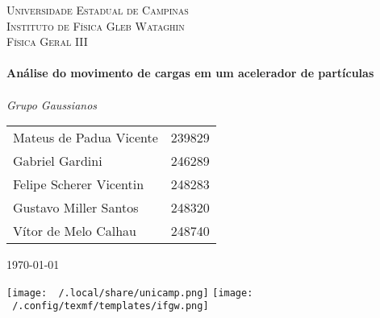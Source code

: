 \begin{titlepage}

	\center


	\textsc{\LARGE Universidade Estadual de Campinas}\\[1.5cm]

	\textsc{\Large Instituto de Física Gleb Wataghin}\\[0.5cm]

	\textsc{\large Física Geral III}\\[0.5cm]


	\HRule\\[0.4cm]

	{\huge\bfseries Análise do movimento de cargas em um acelerador de partículas}\\[0.4cm] %

	\HRule\\[1.5cm]

	{\large\textit{Grupo Gaussianos}} \\
	\begin{tabular}{ l r }
		Mateus de Padua Vicente & 239829 \\
		Gabriel Gardini         & 246289 \\
		Felipe Scherer Vicentin & 248283 \\
		Gustavo Miller Santos   & 248320 \\
		Vítor de Melo Calhau    & 248740
	\end{tabular}


	\vfill\vfill\vfill

	{\large\today}


	\vfill\vfill
	\texttt{[image: ~/.local/share/unicamp.png]}
	\hfill
	\texttt{[image: ~/.config/texmf/templates/ifgw.png]}
\end{titlepage}
